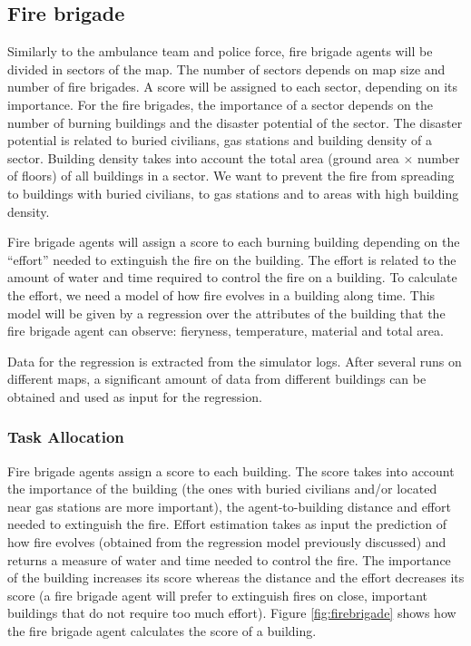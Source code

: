 \subsection{Fire brigade}
\label{sec:firefighters}
Similarly to the ambulance team and police force, fire brigade agents will be divided in sectors of the map. The number of sectors depends on map size and number of fire brigades. %
A score will be assigned to each sector, depending on its importance. For the fire brigades, the importance of a sector depends on the number of burning buildings and the disaster potential of the sector. The disaster potential is related to buried civilians, gas stations and building density of a sector. Building density takes into account the total area (ground area $\times$ number of floors) of all buildings in a sector. We want to prevent the fire from spreading to buildings with buried civilians, to gas stations and to areas with high building density.

Fire brigade agents will assign a score to each burning building depending on the ``effort'' needed to extinguish the fire on the building. The effort is related to the amount of water and time required to control the fire on a building. To calculate the effort, we need a model of how fire evolves in a building along time. This model will be given by a regression over the attributes of the building that the fire brigade agent can observe: fieryness, temperature, material and total area.

Data for the regression is extracted from the simulator logs. After several runs on different maps, a significant amount of data from different buildings can be obtained and used as input for the regression.

\subsubsection{Task Allocation}

Fire brigade agents assign a score to each building. The score takes into account the importance of the building (the ones with buried civilians and/or located near gas stations are more important), the agent-to-building distance and effort needed to extinguish the fire. Effort estimation takes as input the prediction of how fire evolves (obtained from the regression model previously discussed) and returns a measure of water and time needed to control the fire. The importance of the building increases its score whereas the distance and the effort decreases its score (a fire brigade agent will prefer to extinguish fires on close, important buildings that do not require too much effort). Figure \ref{fig:firebrigade} shows how the fire brigade agent calculates the score of a building.

